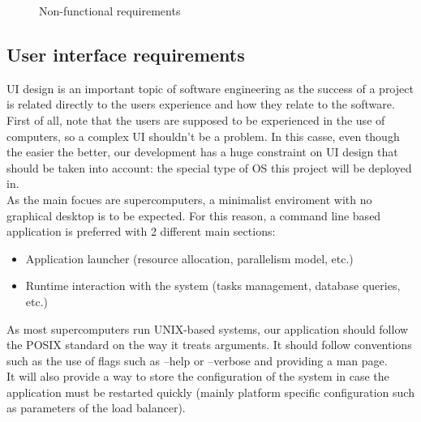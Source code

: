 \begin{figure}[ht!]
\begin{center}
\begin{tabular}{||c | c | p{7cm} | c||}
    \end{tabular}

  \end{center}

  \caption{Non-functional requirements}
  \label{non_functional:fig}
\end{figure}

\subsection{User interface requirements}

UI design is an important topic of software engineering as the success of a
project is related directly to the users experience and how they relate to the
software.\\

First of all, note that the users are supposed to be experienced in the use of
computers, so a complex UI shouldn't be a problem. In this casse, even though
the easier the better, our development has a huge constraint on UI design that
should be taken into account: the special type of OS this project
will be deployed in.\\

As the main focues are supercomputers, a minimalist enviroment
with no graphical desktop is to be expected. For this reason, a
command line based application is preferred with 2 different main sections:\\
\begin{itemize}
  \item Application launcher (resource allocation, parallelism model, etc.)
  \item Runtime interaction with the system (tasks management, database
  queries, etc.)
\end{itemize}

As most supercomputers run UNIX-based systems, our application should follow
the POSIX\cite{POSIX_arguments} standard on the way it treats arguments.
It should follow conventions such as the use of flags such as --help or
--verbose and providing a man page.\\

It will also provide a way to store the configuration of the system in case
the application must be restarted quickly (mainly platform specific
configuration such as parameters of the load balancer). \\
